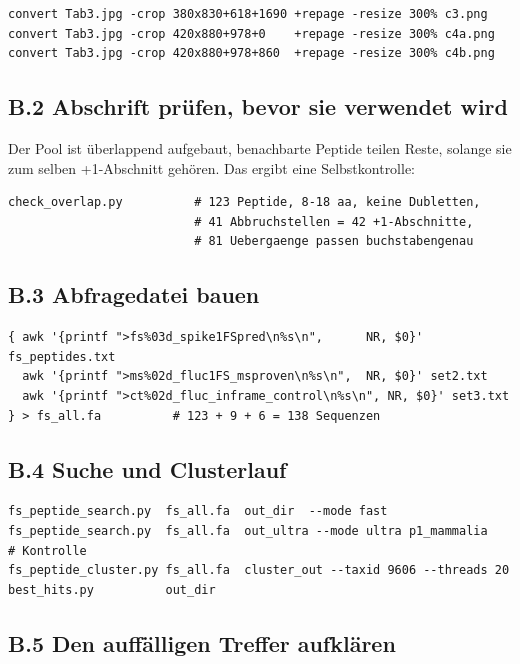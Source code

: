 \documentclass[11pt,a4paper]{article}
\begin{document}
\begin{lstlisting}
convert Tab3.jpg -crop 380x830+618+1690 +repage -resize 300% c3.png
convert Tab3.jpg -crop 420x880+978+0    +repage -resize 300% c4a.png
convert Tab3.jpg -crop 420x880+978+860  +repage -resize 300% c4b.png
\end{lstlisting}

\subsection*{B.2 Abschrift prüfen, bevor sie verwendet wird}

Der Pool ist überlappend aufgebaut, benachbarte Peptide teilen Reste, solange
sie zum selben +1-Abschnitt gehören. Das ergibt eine Selbstkontrolle:

\begin{lstlisting}
check_overlap.py          # 123 Peptide, 8-18 aa, keine Dubletten,
                          # 41 Abbruchstellen = 42 +1-Abschnitte,
                          # 81 Uebergaenge passen buchstabengenau
\end{lstlisting}

\subsection*{B.3 Abfragedatei bauen}

\begin{lstlisting}
{ awk '{printf ">fs%03d_spike1FSpred\n%s\n",      NR, $0}' fs_peptides.txt
  awk '{printf ">ms%02d_fluc1FS_msproven\n%s\n",  NR, $0}' set2.txt
  awk '{printf ">ct%02d_fluc_inframe_control\n%s\n", NR, $0}' set3.txt
} > fs_all.fa          # 123 + 9 + 6 = 138 Sequenzen
\end{lstlisting}

\subsection*{B.4 Suche und Clusterlauf}

\begin{lstlisting}
fs_peptide_search.py  fs_all.fa  out_dir  --mode fast
fs_peptide_search.py  fs_all.fa  out_ultra --mode ultra p1_mammalia   # Kontrolle
fs_peptide_cluster.py fs_all.fa  cluster_out --taxid 9606 --threads 20
best_hits.py          out_dir
\end{lstlisting}

\subsection*{B.5 Den auffälligen Treffer aufklären}
\end{document}
